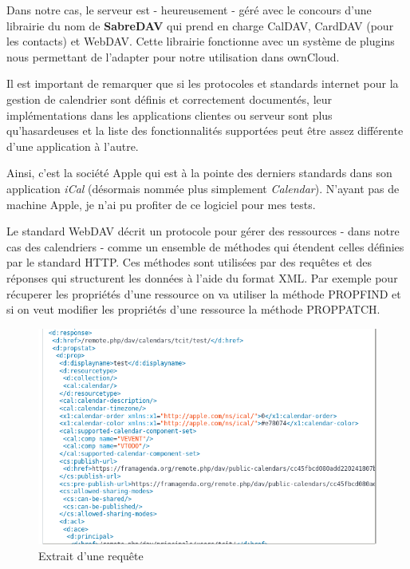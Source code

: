 \documentclass[10pt,a4paper, twoside]{report}
\begin{document}
	Dans notre cas, le serveur est - heureusement - géré avec le concours d'une librairie du nom de \textbf{SabreDAV} qui prend en charge CalDAV, CardDAV (pour les contacts) et WebDAV. Cette librairie fonctionne avec un système de plugins nous permettant de l'adapter pour notre utilisation dans ownCloud.
	
	Il est important de remarquer que si les protocoles et standards internet pour la gestion de calendrier sont définis et correctement documentés, leur implémentations dans les applications clientes ou serveur sont plus qu'hasardeuses et la liste des fonctionnalités supportées peut être assez différente d'une application à l'autre.
	
	Ainsi, c'est la société Apple qui est à la pointe des derniers standards dans son application \textit{iCal} (désormais nommée plus simplement \textit{Calendar}). N'ayant pas de machine Apple, je n'ai pu profiter de ce logiciel pour mes tests.
	
	Le standard WebDAV décrit un protocole pour gérer des ressources - dans notre cas des calendriers - comme un ensemble de méthodes qui étendent celles définies par le standard HTTP. Ces méthodes sont utilisées par des requêtes et des réponses qui structurent les données à l'aide du format XML. Par exemple pour récuperer les propriétés d'une ressource on va utiliser la méthode PROPFIND et si on veut modifier les propriétés d'une ressource la méthode PROPPATCH.
	
	\begin{figure}[ht]
		\centering
		\includegraphics[width=1\textwidth]{images/requete-xml.png}
		\caption*{Extrait d'une requête}
		\label{normal_case}
	\end{figure}
	
\end{document}
